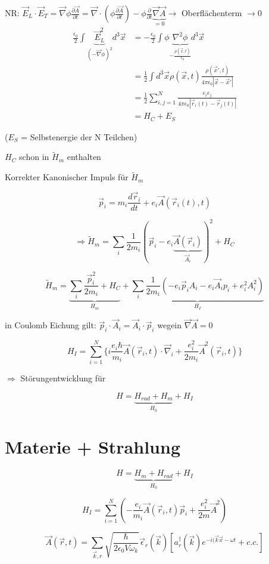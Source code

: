 NR: \(\vec E_L\cdot\vec E_T = \vec\nabla\phi\frac{\partial\vec A}{\partial t} = \vec\nabla\cdot(\phi\frac{\partial\vec A}{\partial t}) - \phi\frac{\partial}{\partial t}\underbrace{\vec \nabla\vec A}_{=0} \rightarrow  \) Oberflächenterm \(\rightarrow 0\)
\begin{align} 
\frac{\epsilon_0}{2} \int \underbrace{ \vec E^2_L}_{(-\vec\nabla\phi)^2}d^3\vec x &= -\frac{\epsilon_0}{2} \int\phi\underbrace{\nabla^2\phi}_{-\frac{\rho(\vec x,t)}{\epsilon_0}}d^3\vec x\\
&= \frac{1}{2}\int d^3\vec x \rho(\vec x,t) \frac{\rho(\vec x',t)}{4\pi\epsilon_0|\vec x-\vec x'|} \\
&=  \frac{1}{2} \sum_{i,j=1}^N \frac{e_ie_j}{4\pi\epsilon_0|\vec r_i(t)-\vec r_j(t)|}\\
&= H_C+E_S
\end{align}


(\(E_S\) = Selbstenergie der N Teilchen)

\(H_C\) schon in \(\tilde H_m\) enthalten

Korrekter Kanonischer Impuls für \(\tilde H_m\)

\[\vec p_i = m_i\frac{d\vec r_i}{dt}+e_i\vec A(\vec r_i(t),t)\]

\[\Rightarrow \tilde H_m = \sum_i\frac{1}{2m_i}(\vec p_i-e_i\underbrace{\vec A(\vec r_i)}_{\vec A_i})^2+H_C\]


\[\tilde H_m = \underbrace{\sum_i \frac{\vec p_i^2}{2m_i}+H_C}_{H_m} + \underbrace{\sum_i \frac{1}{2m_i}(-e_i\vec p_i A_i-e_i\vec A_ip_i+e^2_iA^2_i)}_{H_I}\]

in Coulomb Eichung gilt: \(\vec p_i\cdot\vec A_i = \vec A_i\cdot\vec p_i\) wegein \(\vec\nabla\vec A = 0\)

\[H_I = \sum_{i=1}^N \{ i\frac{e_i\hbar}{m_i}\vec A(\vec r_i,t)\cdot\vec\nabla_i + \frac{ e^2_i}{2m_i}\vec A^2(\vec r_i,t) \}\]

\(\Rightarrow \) Störungentwicklung für

\[H = \underbrace{H_{rad}+H_m}_{H_0} + H_I\]


\section{Materie + Strahlung}

\[H = \underbrace{H_m+H_{rad}}_{H_0}+H_I\]

\[H_I = \sum_{i=1}^{N}(-\frac{e_i}{m_i}\vec A(\vec r_i,t)\vec p_i + \frac{e_i^2}{2m}\vec A^2)\]

\[\vec A(\vec r,t) =\sum_{\vec k,r}\sqrt{\frac{\hbar}{2\epsilon_0V\omega_k}}\vec\epsilon_r(\vec k)[a^\dagger_r(\vec k) e^{-i(\vec k\vec x-\omega t}+c.c.]\]


